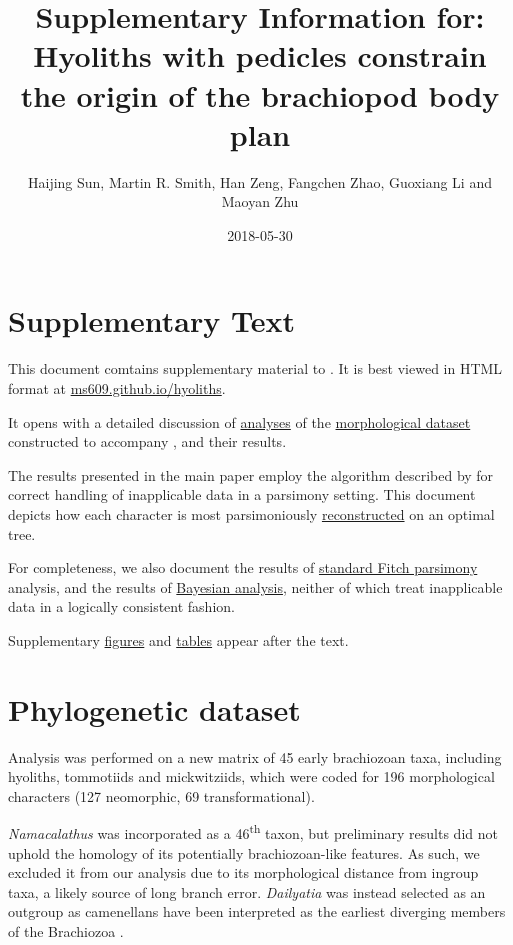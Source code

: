 \documentclass[openany]{book}
\title{Supplementary Information for: \newline\newline Hyoliths with pedicles
constrain the origin of the brachiopod body plan}
\author{Haijing Sun, Martin R. Smith, Han Zeng, Fangchen Zhao, Guoxiang Li and
Maoyan Zhu}
\date{2018-05-30}
\theoremstyle{definition}
\theoremstyle{definition}
\theoremstyle{definition}
\theoremstyle{remark}
\begin{document}
\maketitle

{
\setcounter{tocdepth}{1}
\tableofcontents
}
\chapter*{Supplementary Text}\label{supplementary-text}

This document comtains supplementary material to
\citet{Sun2018Hyolithswith}. It is best viewed in HTML format at
\href{https://ms609.github.io/hyoliths/}{ms609.github.io/hyoliths}.

It opens with a detailed discussion of
\protect\hyperlink{treesearch}{analyses} of the
\protect\hyperlink{dataset}{morphological dataset} constructed to
accompany \citet{Sun2018Hyolithswith}, and their results.

The results presented in the main paper employ the algorithm described
by \citet{Brazeau2018} for correct handling of inapplicable data in a
parsimony setting. This document depicts how each character is most
parsimoniously \protect\hyperlink{reconstructions}{reconstructed} on an
optimal tree.

For completeness, we also document the results of
\protect\hyperlink{fitch}{standard Fitch parsimony} analysis, and the
results of \protect\hyperlink{bayesian}{Bayesian analysis}, neither of
which treat inapplicable data in a logically consistent fashion.

Supplementary \protect\hyperlink{figures}{figures} and
\protect\hyperlink{table}{tables} appear after the text.

\hypertarget{dataset}{\chapter{Phylogenetic dataset}\label{dataset}}

Analysis was performed on a new matrix of 45 early brachiozoan taxa,
including hyoliths, tommotiids and mickwitziids, which were coded for
196 morphological characters (127 neomorphic, 69 transformational).

\emph{Namacalathus} was incorporated as a 46\textsuperscript{th} taxon,
but preliminary results did not uphold the homology of its potentially
brachiozoan-like features. As such, we excluded it from our analysis due
to its morphological distance from ingroup taxa, a likely source of long
branch error. \emph{Dailyatia} was instead selected as an outgroup as
camenellans have been interpreted as the earliest diverging members of
the Brachiozoa \citep{Skovsted2015Theearly, Zhao2017}.
\end{document}
